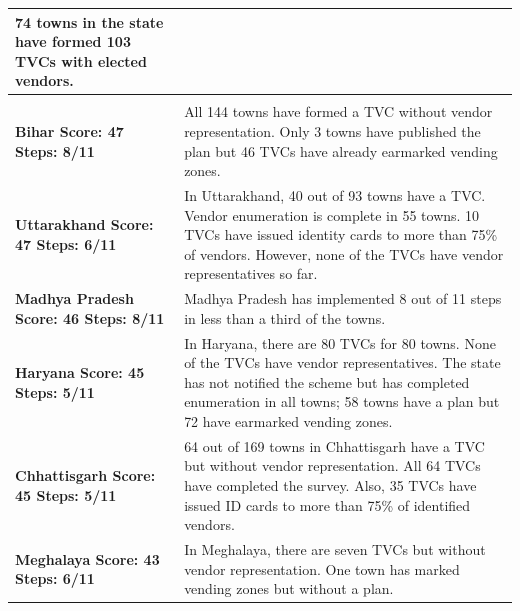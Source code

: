 \documentclass[a4paper, 12pt, twoside]{article}
\begin{document}
{\begin{longtable}[l]{>{\raggedright}p{4cm}>{\raggedright\arraybackslash}p{10cm}}
74 towns in the state have formed 103 TVCs with elected vendors.
\\
\midrule
\multicolumn{2}{l}{States with Moderate Compliance (Index Score Between 30 to 49)}\\
\midrule
\cellcolor{SVACyellow1}\bf{Bihar}
\newline
\bf{Score: 47}
\newline
\bf{Steps: 8/11}
&
\cellcolor{SVACyellow2}All 144 towns have formed a TVC without vendor representation. Only 3 towns have published the plan but 46 TVCs have already earmarked vending zones.
\\
\cellcolor{SVACyellow1}\bf{Uttarakhand}
\newline
\bf{Score: 47}
\newline
\bf{Steps: 6/11}
&
\cellcolor{SVACyellow2}In Uttarakhand, 40 out of 93 towns have a TVC. Vendor enumeration is complete in 55 towns. 10 TVCs have issued identity cards to more than 75\% of vendors. However, none of the TVCs have vendor representatives so far.
\\
\cellcolor{SVACyellow1}\bf{Madhya Pradesh}
\newline
\bf{Score: 46}
\newline
\bf{Steps: 8/11}
&
\cellcolor{SVACyellow2}Madhya Pradesh has implemented 8 out of 11 steps in less than a third of the towns.
\\
\cellcolor{SVACyellow1}\bf{Haryana}
\newline
\bf{Score: 45}
\newline
\bf{Steps: 5/11}
&
\cellcolor{SVACyellow2}In Haryana, there are 80 TVCs for 80 towns. None of the TVCs have vendor representatives. The state has not notified the scheme but has completed enumeration in all towns; 58 towns have a plan but 72 have earmarked vending zones.
\\
\cellcolor{SVACyellow1}\bf{Chhattisgarh}
\newline
\bf{Score: 45}
\newline
\bf{Steps: 5/11}
&
\cellcolor{SVACyellow2}64 out of 169 towns in Chhattisgarh have a TVC but without vendor representation. All 64 TVCs have completed the survey. Also, 35 TVCs have issued ID cards to more than 75\% of identified vendors.
\\
\cellcolor{SVACyellow1}\bf{Meghalaya}
\newline
\bf{Score: 43}
\newline
\bf{Steps: 6/11}
&
\cellcolor{SVACyellow2}In Meghalaya, there are seven TVCs but without vendor representation. One town has marked vending zones but without a plan.

\end{longtable}}
\end{document}

